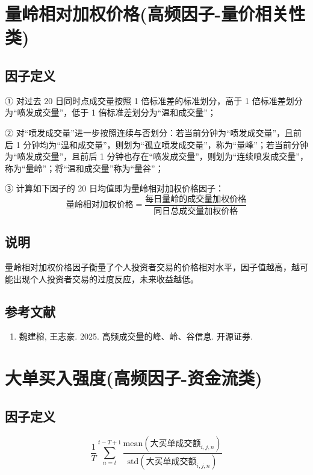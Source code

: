 \documentclass{article}
\begin{document}
\section{量岭相对加权价格(高频因子-量价相关性类)}

\subsection{因子定义}


① 对过去 20 日同时点成交量按照 1 倍标准差的标准划分，高于 1 倍标准差划分为“喷发成交量”，低于 1 倍标准差划分为“温和成交量”；

② 对“喷发成交量”进一步按照连续与否划分：若当前分钟为“喷发成交量”，且前后 1 分钟均为“温和成交量”，则划为“孤立喷发成交量”，称为“量峰”；若当前分钟为“喷发成交量”，且前后 1 分钟也存在“喷发成交量”，则划为“连续喷发成交量”，称为“量岭”；将“温和成交量”称为“量谷”；

③ 计算如下因子的 20 日均值即为量岭相对加权价格因子：
\begin{equation}
    \text{量岭相对加权价格} = \frac{\text{每日量岭的成交量加权价格}}{\text{同日总成交量加权价格}}
\end{equation}

\subsection{说明}
量岭相对加权价格因子衡量了个人投资者交易的价格相对水平，因子值越高，越可能出现个人投资者交易的过度反应，未来收益越低。

\subsection{参考文献}
\begin{enumerate}
    \item 魏建榕, 王志豪. 2025. 高频成交量的峰、岭、谷信息. 开源证券.
\end{enumerate}

\section{大单买入强度(高频因子-资金流类)}

\subsection{因子定义}

\begin{equation}
    \frac{1}{T} \sum_{n=t}^{t-T+1} \frac{\mathrm{mean}(\text{大买单成交额}_{i,j,n})}{\mathrm{std}(\text{大买单成交额}_{i,j,n})}
\end{equation}
\end{document}

